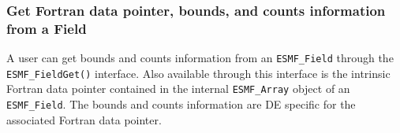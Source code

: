  
\setlength{\oldparskip}{\parskip}
\setlength{\parskip}{1.5ex}
\setlength{\oldparindent}{\parindent}
\setlength{\parindent}{0pt}
\setlength{\oldbaselineskip}{\baselineskip}
\setlength{\baselineskip}{11pt}
 
\def\bv{\begin{verbatim}}
\def\ev{\end{verbatim}}
\def\be{\begin{equation}}
\def\ee{\end{equation}}
\def\bea{\begin{eqnarray}}
\def\eea{\end{eqnarray}}
\def\bi{\begin{itemize}}
\def\ei{\end{itemize}}
\def\bn{\begin{enumerate}}
\def\en{\end{enumerate}}
\def\bd{\begin{description}}
\def\ed{\end{description}}
\def\({\left (}
\def\){\right )}
\def\[{\left [}
\def\]{\right ]}
\def\<{\left  \langle}
\def\>{\right \rangle}
\def\cI{{\cal I}}
\def\diag{\mathop{\rm diag}}
\def\tr{\mathop{\rm tr}}


 

  \subsubsection{Get Fortran data pointer, bounds, and counts information from a Field}
  \label{sec:field:usage:field_get_dataptr}
  
    A user can get bounds and counts information from an {\tt ESMF\_Field}
    through the {\tt ESMF\_FieldGet()} interface.  Also available through this interface
    is the intrinsic
    Fortran data pointer contained in the internal {\tt ESMF\_Array} object
    of an {\tt ESMF\_Field}. The bounds and counts information are DE specific
    for the associated Fortran data pointer.
  
